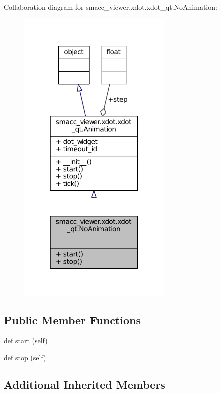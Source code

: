 Collaboration diagram for smacc\+\_\+viewer.\+xdot.\+xdot\+\_\+qt.\+No\+Animation\+:
\nopagebreak
\begin{figure}[H]
\begin{center}
\leavevmode
\includegraphics[width=211pt]{classsmacc__viewer_1_1xdot_1_1xdot__qt_1_1NoAnimation__coll__graph}
\end{center}
\end{figure}
\subsection*{Public Member Functions}
\begin{DoxyCompactItemize}
\item 
def \hyperlink{classsmacc__viewer_1_1xdot_1_1xdot__qt_1_1NoAnimation_a2d575bb87a65b96f7535eaa363d128ff}{start} (self)
\item 
def \hyperlink{classsmacc__viewer_1_1xdot_1_1xdot__qt_1_1NoAnimation_ac48d3a9ed84dc69f1770288717e15947}{stop} (self)
\end{DoxyCompactItemize}
\subsection*{Additional Inherited Members}


